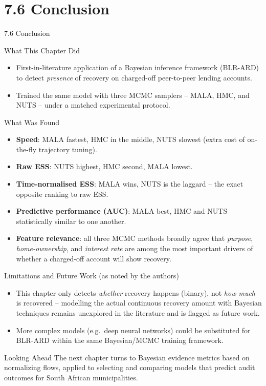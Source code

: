 \documentclass[aspectratio=169,10pt]{beamer}
\begin{document}
\section{7.6 Conclusion}

\begin{frame}[allowframebreaks]{7.6 Conclusion}

\begin{block}{What This Chapter Did}
\begin{itemize}
  \item First-in-literature application of a Bayesian inference framework (BLR-ARD) to detect \emph{presence} of recovery on charged-off peer-to-peer lending accounts.
  \item Trained the same model with three MCMC samplers -- MALA, HMC, and NUTS -- under a matched experimental protocol.
\end{itemize}
\end{block}

\begin{block}{What Was Found}
\begin{itemize}
  \item \textbf{Speed}: MALA fastest, HMC in the middle, NUTS slowest (extra cost of on-the-fly trajectory tuning).
  \item \textbf{Raw ESS}: NUTS highest, HMC second, MALA lowest.
  \item \textbf{Time-normalised ESS}: MALA wins, NUTS is the laggard -- the exact opposite ranking to raw ESS.
  \item \textbf{Predictive performance (AUC)}: MALA best, HMC and NUTS statistically similar to one another.
  \item \textbf{Feature relevance}: all three MCMC methods broadly agree that \emph{purpose}, \emph{home-ownership}, and \emph{interest rate} are among the most important drivers of whether a charged-off account will show recovery.
\end{itemize}
\end{block}

\framebreak

\begin{block}{Limitations and Future Work (as noted by the authors)}
\begin{itemize}
  \item This chapter only detects \emph{whether} recovery happens (binary), not \emph{how much} is recovered -- modelling the actual continuous recovery amount with Bayesian techniques remains unexplored in the literature and is flagged as future work.
  \item More complex models (e.g.\ deep neural networks) could be substituted for BLR-ARD within the same Bayesian/MCMC training framework.
\end{itemize}
\end{block}

\begin{alertblock}{Looking Ahead}
The next chapter turns to Bayesian evidence metrics based on normalizing flows, applied to selecting and comparing models that predict audit outcomes for South African municipalities.
\end{alertblock}

\end{frame}
\end{document}
